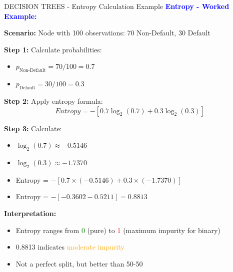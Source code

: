 \documentclass[8pt]{beamer}
\begin{document}
	\begin{frame}{DECISION TREES - Entropy Calculation Example}
		\fontsize{6.5}{7.5}\selectfont
		\textcolor{blue}{\textbf{Entropy - Worked Example:}}
		
		\textbf{Scenario:} Node with 100 observations: 70 Non-Default, 30 Default
		
		\textbf{Step 1:} Calculate probabilities:
		\begin{itemize}
			\item $p_{\text{Non-Default}} = 70/100 = 0.7$
			\item $p_{\text{Default}} = 30/100 = 0.3$
		\end{itemize}
		
		\textbf{Step 2:} Apply entropy formula:
		\[
		Entropy = -[0.7 \log_2(0.7) + 0.3 \log_2(0.3)]
		\]
		
		\textbf{Step 3:} Calculate:
		\begin{itemize}
			\item $\log_2(0.7) \approx -0.5146$
			\item $\log_2(0.3) \approx -1.7370$
			\item Entropy = $-[0.7 \times (-0.5146) + 0.3 \times (-1.7370)]$
			\item Entropy = $-[-0.3602 - 0.5211] = 0.8813$
		\end{itemize}
		
		\textbf{Interpretation:}
		\begin{itemize}
			\item Entropy ranges from \textcolor{green}{0} (pure) to \textcolor{red}{1} (maximum impurity for binary)
			\item 0.8813 indicates \textcolor{orange}{moderate impurity}
			\item Not a perfect split, but better than 50-50
		\end{itemize}
	\end{frame}
	
\end{document}
